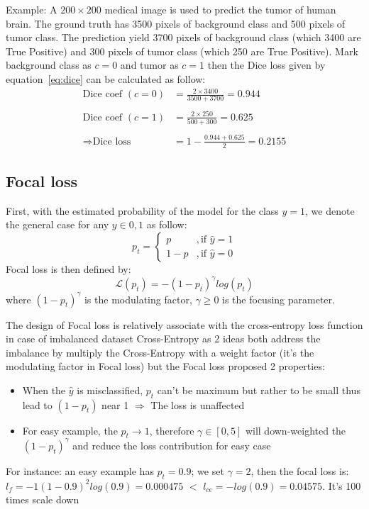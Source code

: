 \noindent
Example: A $200\times200$ medical image is used to predict the tumor of human brain. The ground truth has 3500 pixels of background class and 500 pixels of tumor class. The prediction yield 3700 pixels of background class (which 3400 are True Positive) and 300 pixels of tumor class (which 250 are True Positive). Mark background class as $c=0$ and tumor as $c=1$ then the Dice loss given by equation~\ref{eq:dice} can be calculated as follow:\newline
\begin{align*}
\text{Dice coef }(c=0) &= \frac{2\times3400}{3500+3700} = 0.944 \\ 
\\
\text{Dice coef }(c=1) &= \frac{2\times250}{500+300} = 0.625 \\
\\
\Rightarrow\text{Dice loss} &= 1 - \frac{0.944 + 0.625}{2} = 0.2155 
\end{align*}


\subsection{Focal loss}

First, with the estimated probability of the model for the class $y=1$, we denote the general case for any $y \in{0,1}$ as follow:
\begin{equation}
    p_{t} = 
    \begin{cases}
    p &, \text{if }\hat{y}=1\\
    1-p &, \text{if } \hat{y}=0 
    \end{cases}
\end{equation}
Focal loss is then defined by:
\begin{equation}
    \mathcal{L}(p_{t}) = -(1-p_{t})^{\gamma}log(p_{t})
\end{equation}
where $(1-p_{t})^{\gamma}$ is the modulating factor, $\gamma \geq0$ is the focusing parameter.\newline \noindent

The design of Focal loss is relatively associate with the cross-entropy loss function in case of imbalanced dataset Cross-Entropy as 2 ideas both address the imbalance by multiply the Cross-Entropy with a weight factor (it's the modulating factor in Focal loss) but the Focal loss proposed 2 properties:
\begin{itemize}
    \item When the $\hat{y}$ is misclassified, $p_{t}$ can't be maximum but rather to be small thus lead to $(1-p_{t})$ near 1 $\Rightarrow$ The loss is unaffected
    \item For easy example, the $p_{t}\rightarrow1$, therefore $\gamma \in [0,5]$ will down-weighted the $(1-p_{t})^{\gamma}$ and reduce the loss contribution for easy case
\end{itemize}
For instance: an easy example has $p_{t}=0.9$; we set $\gamma=2$, then the focal loss is: $l_{f} = -1(1-0.9)^{2}log(0.9)=0.000475$ $<$ $l_{ce} = -log(0.9)=0.04575$. It's 100 times scale down\newline

